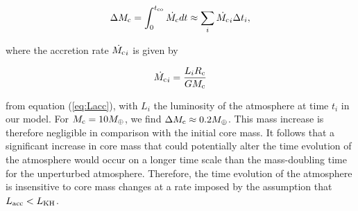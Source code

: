 \documentclass[apj]{emulateapj}
\newcommand{\co}{_{\rm c}}
\begin{document}
\begin{equation}
\label{eq:cminc}
\Delta M_{\rm{c}} = \int_0^{t_{\rm{co}}} \dot{M_{\rm{c}}} dt \approx \sum_i \dot{M_{\rm{c}}}_i \Delta t_i,
\end{equation}
 
 \noindent where the accretion rate $ \dot{M_{\rm{c}}}_i $ is given by 
 
 \begin{equation}
 \label{eq:Mdotexp}
 \dot{M_{\rm{c}}}_i =\frac{L_i R\co}{G M_{\rm{c}}} 
 \end{equation}
 
 \noindent from equation (\ref{eq:Lacc}), with $L_i$ the luminosity of the atmosphere at time $t_i$ in our model. For $M_{\rm{c}}=10 M_{\oplus}$, we find $\Delta M_{\rm{c}} \approx 0.2 M_{\oplus}$. This mass increase is therefore negligible in comparison with the initial core mass. It follows that a significant increase in core mass that could potentially alter the time evolution of the atmosphere would occur on a longer time scale than the mass-doubling time for the unperturbed atmosphere. Therefore, the time evolution of the atmosphere is insensitive to core mass changes at a rate imposed by the assumption that $L_{\rm{acc}}<L_{\rm{KH}}$.

%
%
%
%

%
%  
\end{document}
